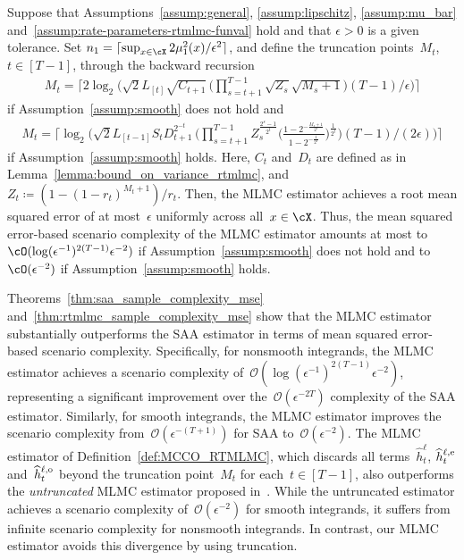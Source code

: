 \documentclass[11pt]{article}
\let\hat\widehat
\begin{document}
\begin{theorem}
\label{thm:rtmlmc_sample_complexity_mse} 
Suppose that Assumptions~\ref{assump:general}, \ref{assump:lipschitz}, \ref{assump:mu_bar} and~\ref{assump:rate-parameters-rtmlmc-funval} hold and that $\epsilon>0$ is a given tolerance. Set $n_1=\lceil \sup_{x\in\cX} 2\mu_1^2(x)/\epsilon^2\rceil$, and define the truncation points~$M_t$, $t\in[T-1]$, through the backward recursion
\begin{align*}
     M_{t} = \bigg\lceil 2\log_2\Big( \textstyle \sqrt{2}L_{[t]}\sqrt{C_{t+1}} \, \Big( \prod_{s=t+1}^{T-1} \sqrt{Z_s} \sqrt{M_s+1} \Big) (T-1)/\epsilon \Big) \bigg\rceil
\end{align*}
if Assumption~\ref{assump:smooth} does not hold and 
\begin{align*}
     \textstyle M_{t}  = \bigg\lceil\log_2\bigg( \sqrt{2}L_{[t-1]}S_{t}D_{t+1}^{2^{-t}} \, \bigg( \prod_{s=t+1}^{T-1}Z_s^{\frac{2^s-1}{2^t}} \Big(\frac{1-2^{-\frac{M_s+1}{2^s}}}{1-2^{-\frac{1}{2^s}}} \Big)^\frac{1}{2^t} \bigg)  (T-1)/(2\epsilon)\bigg)\bigg\rceil
\end{align*}
if Assumption~\ref{assump:smooth} holds. Here, $C_t$ and~$D_t$ are defined as in Lemma~\ref{lemma:bound_on_variance_rtmlmc}, and $Z_t\coloneqq ( 1-(1-r_t)^{M_t+1} ) / r_t$. Then, the  MLMC estimator achieves a root mean squared error of at most~$\epsilon$ uniformly across all~$x\in\cX$. Thus, the mean squared error-based scenario complexity of the MLMC estimator amounts at most to $\cO(\log(\epsilon^{-1})^{2(T-1)}\epsilon^{-2})$ if Assumption~\ref{assump:smooth} does not hold and to $\cO(\epsilon^{-2})$ if Assumption~\ref{assump:smooth} holds.
\end{theorem}


Theorems~\ref{thm:saa_sample_complexity_mse} and~\ref{thm:rtmlmc_sample_complexity_mse} show that the MLMC estimator substantially outperforms the SAA estimator in terms of mean squared error-based scenario complexity. Specifically, for nonsmooth integrands, the MLMC estimator achieves a scenario complexity of~$\mathcal{O}(\log(\epsilon^{-1})^{2(T-1)}\epsilon^{-2})$, representing a significant improvement over the~$\mathcal{O}(\epsilon^{-2T})$ complexity of the SAA estimator. Similarly, for smooth integrands, the MLMC estimator improves the scenario complexity from~$\mathcal{O}(\epsilon^{-(T+1)})$ for SAA to~$\mathcal{O}(\epsilon^{-2})$. The MLMC estimator of Definition~\ref{def:MCCO_RTMLMC}, which discards all terms~$\hat{h}_t^{\ell}$, $\hat{h}_t^{\ell,{\rm e}}$ and~$\hat{h}_t^{\ell,{\rm o}}$ beyond the truncation point~$M_t$ for each~$t \in [T-1]$, also outperforms the \emph{untruncated} MLMC estimator proposed in~\cite{syed2023optimal}. While the untruncated estimator achieves a scenario complexity of~$\mathcal{O}(\epsilon^{-2})$ for smooth integrands, it suffers from infinite scenario complexity for nonsmooth integrands. In contrast, our MLMC estimator avoids this divergence by using truncation.
\end{document}
